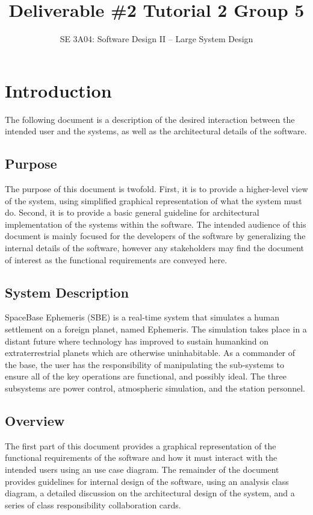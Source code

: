 \documentclass[]{article}
\title{Deliverable \#2 Tutorial 2 Group 5}
\author{SE 3A04: Software Design II -- Large System Design}
\date{}
\begin{document}
\maketitle	

\section{Introduction}
\label{sec:introduction}

The following document is a description of the desired interaction between the intended user and the systems, as well as the architectural details of the software. 

\subsection{Purpose}
\label{sub:purpose}
The purpose of this document is twofold. First, it is to provide a higher-level view of the system, using simplified graphical representation of what the system must do. Second, it is to provide a basic general guideline for architectural implementation of the systems within the software. The intended audience of this document is mainly focused for the developers of the software by generalizing the internal details of the software, however any stakeholders may find the document of interest as the functional requirements are conveyed here.

\subsection{System Description}
\label{sub:system_description}
SpaceBase Ephemeris (SBE) is a real-time system that simulates a human settlement on a foreign planet, named Ephemeris.  The simulation takes place in a distant future where technology has improved to sustain humankind on extraterrestrial planets which are otherwise uninhabitable. As a commander of the base, the user has the responsibility of manipulating the sub-systems to ensure all of the key operations are functional, and possibly ideal. The three subsystems are power control, atmospheric simulation, and the station personnel.

\subsection{Overview}
\label{sub:overview}
The first part of this document provides a graphical representation of the functional requirements of the software and how it must interact with the intended users using an use case diagram. The remainder of the document provides guidelines for internal design of the software, using an analysis class diagram, a detailed discussion on the architectural design of the system, and a series of class responsibility collaboration cards. 
\end{document}
